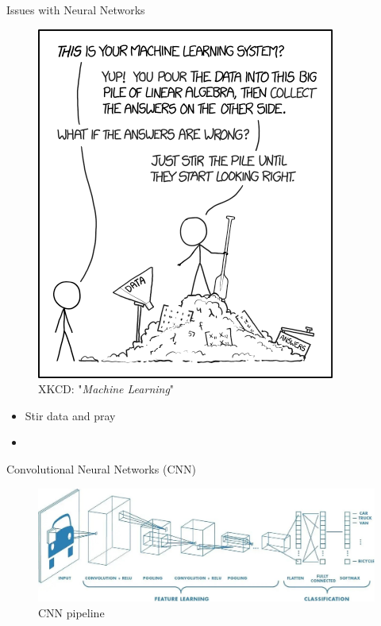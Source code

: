 \documentclass{beamer}
\begin{document}
\begin{frame}{Issues with Neural Networks}
	\begin{multicols}{2}
		\begin{figure}
			\includegraphics[width=.4\textwidth]{../Images/xkcd_machine_learning.png}
			\caption{XKCD: "\textit{Machine Learning}" \cite{xkcd-ml}}
		\end{figure}
		
		\columnbreak
		
		\null \vfill
		\begin{itemize}
			\item Stir data and pray
			\item 
		\end{itemize}
		\vfill \null
	\end{multicols}
\end{frame}

\begin{frame}{Convolutional Neural Networks (CNN)}
	\begin{figure}
		\includegraphics[width=.9\textwidth]{../Images/big-pic-cnn.jpg}
		\caption{CNN pipeline \cite{eli5CNN}}
	\end{figure}
\end{frame}
\end{document}
